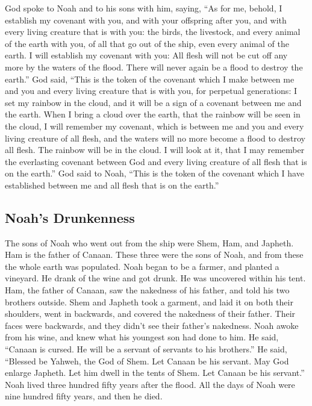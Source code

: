  God spoke to Noah and to his sons with him, saying,
 ``As for me, behold, I establish my covenant with you,
and with your offspring after you,  and with every living
creature that is with you: the birds, the livestock, and every animal of
the earth with you, of all that go out of the ship, even every animal of
the earth.  I will establish my covenant with you: All
flesh will not be cut off any more by the waters of the flood. There
will never again be a flood to destroy the earth.''  God
said, ``This is the token of the covenant which I make between me and
you and every living creature that is with you, for perpetual
generations:  I set my rainbow in the cloud, and it will
be a sign of a covenant between me and the earth.  When I
bring a cloud over the earth, that the rainbow will be seen in the
cloud,  I will remember my covenant, which is between me
and you and every living creature of all flesh, and the waters will no
more become a flood to destroy all flesh.  The rainbow
will be in the cloud. I will look at it, that I may remember the
everlasting covenant between God and every living creature of all flesh
that is on the earth.''  God said to Noah, ``This is the
token of the covenant which I have established between me and all flesh
that is on the earth.''

\hypertarget{noahs-drunkenness}{%
\subsection{Noah's Drunkenness}\label{noahs-drunkenness}}

 The sons of Noah who went out from the ship were Shem,
Ham, and Japheth. Ham is the father of Canaan.  These
three were the sons of Noah, and from these the whole earth was
populated.  Noah began to be a farmer, and planted a
vineyard.  He drank of the wine and got drunk. He was
uncovered within his tent.  Ham, the father of Canaan,
saw the nakedness of his father, and told his two brothers outside.
 Shem and Japheth took a garment, and laid it on both
their shoulders, went in backwards, and covered the nakedness of their
father. Their faces were backwards, and they didn't see their father's
nakedness.  Noah awoke from his wine, and knew what his
youngest son had done to him.  He said, ``Canaan is
cursed. He will be a servant of servants to his brothers.''
 He said, ``Blessed be Yahweh, the God of Shem. Let
Canaan be his servant.  May God enlarge Japheth. Let him
dwell in the tents of Shem. Let Canaan be his servant.'' 
Noah lived three hundred fifty years after the flood. 
All the days of Noah were nine hundred fifty years, and then he died.

